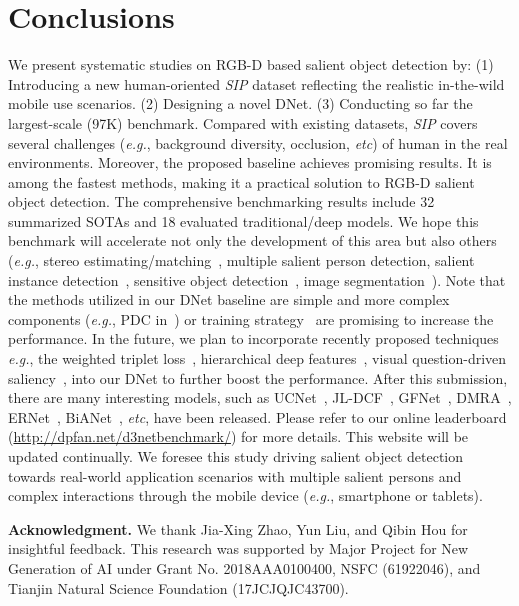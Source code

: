 \documentclass[journal]{IEEEtran}
\def\eg{\emph{e.g.}}
\def\etc{\emph{etc}}
\newcommand{\fdp}[1]{#1}
\begin{document}
\section{Conclusions}\label{sec:conclusion}
We present systematic studies on RGB-D based salient object detection
by: (1) Introducing a new human-oriented \emph{SIP} dataset
reflecting the realistic in-the-wild mobile use scenarios.
(2) Designing a novel DNet.
(3) Conducting so far the largest-scale (97K) benchmark.
\fdp{Compared with existing datasets, \emph{SIP} covers several
challenges (\eg, background diversity, occlusion, \etc) of human in the real environments.}
Moreover, the proposed baseline achieves promising results.
It is among the fastest methods, making it a practical solution \fdp{to RGB-D salient object detection}.
The comprehensive benchmarking results include 32 summarized SOTAs and
18 evaluated traditional/deep models. We hope this benchmark \fdp{will} accelerate not only the development of this area
but also others (\eg, stereo estimating/matching~\cite{nie2019Multi}, multiple salient person
detection, salient instance detection~\cite{li2017instance}, \fdp{sensitive object detection~\cite{yu2016iprivacy}}, \fdp{image segmentation~\cite{shen2019submodular}}).
\fdp{Note that the methods utilized in our DNet baseline are simple and more complex components (\eg, PDC in~\cite{fan2020Camouflage}) or training strategy~\cite{fan2020inf} are promising to increase the performance.
In the future, we plan to incorporate recently proposed techniques \eg, the weighted triplet loss~\cite{yu2019spatial}, hierarchical deep features~\cite{yu2019hierarchical}, visual question-driven saliency~\cite{he2019exploring}, into our DNet to further boost the performance.}
After this submission, there are many interesting models, such as UCNet~\cite{zhang2020UCNet}, JL-DCF~\cite{Fu2020JLDCF}, GFNet~\cite{liu2020cross},
DMRA~\cite{piao2019depth}, ERNet~\cite{piaoexploit}, BiANet~\cite{zhang2020bilateral}, \etc, have been released. Please refer to our online leaderboard (\href{http://dpfan.net/d3netbenchmark/}{http://dpfan.net/d3netbenchmark/}) for more details. This website will be updated continually.
We foresee this study \fdp{driving} salient object detection
towards real-world application scenarios with multiple salient persons and complex interactions
through the mobile device (\eg, \fdp{smartphone or tablets}).

\vspace{.15in}
\noindent\textbf{Acknowledgment. \quad}
We thank Jia-Xing Zhao, Yun Liu, and Qibin Hou for insightful feedback.
This research was supported by Major Project for New Generation of AI
under Grant No. 2018AAA0100400, NSFC (61922046),
and Tianjin Natural Science Foundation (17JCJQJC43700).
\end{document}
